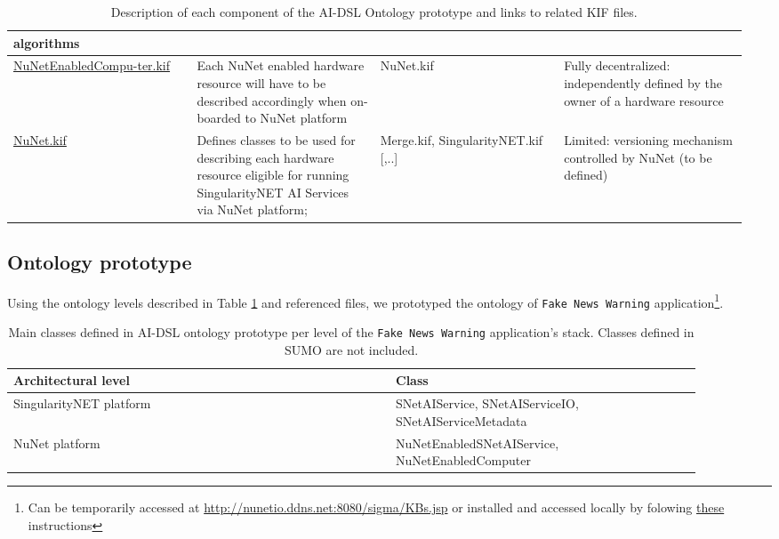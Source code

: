 \documentclass[]{report}
\begin{document}
\begin{table}[H]
\begin{tabular}{p{0.24\linewidth}|p{0.24\linewidth}|p{0.24\linewidth}|p{0.24\linewidth}|}
    algorithms \\
    \hline
    \href{https://github.com/singnet/ai-dsl/blob/master/ontology/
    NuNetEnabledComputer.kif}{NuNetEnabledCompu-ter.kif} &
    Each NuNet enabled hardware resource will have to be described accordingly
    when on-boarded to NuNet platform &
    NuNet.kif &
    Fully decentralized: independently defined by the owner of a hardware
    resource \\
    \hline
    \href{https://github.com/singnet/ai-dsl/blob/master/ontology/NuNet.kif}{NuNet.kif} &
    Defines classes to be used for describing each hardware resource eligible
    for running SingularityNET AI Services via NuNet platform;  &
    Merge.kif, SingularityNET.kif [,..]&
    Limited: versioning mechanism controlled by NuNet (to be defined) \\
    \end{tabular}
  \captionsetup{width=0.7\linewidth}
  \caption{\label{tbl:all_kif_files}Description of each component of the AI-DSL Ontology prototype and links to related KIF files.}
\end{table}

\subsection{Ontology prototype}

Using the ontology levels described in Table \ref{tbl:all_kif_files} and
referenced files, we prototyped the ontology of \texttt{Fake News Warning}
application\footnote{Can be temporarily
accessed at \href{http://nunetio.ddns.net:8080/sigma/KBs.jsp}
{http://nunetio.ddns.net:8080/sigma/KBs.jsp} or installed and accessed locally
by folowing \href{https://github.com/nunet-io/ai-dsl/blob/master/ontology/tools/README.md}{these} instructions}.

\begin{table}[H]
  \scriptsize
  \centering
  \begin{tabular}{p{0.5\linewidth}|p{0.4\linewidth}|}
    \textbf{Architectural level} & \textbf{Class} \\
    \hline
    SingularityNET platform & SNetAIService, SNetAIServiceIO,
    SNetAIServiceMetadata\\
    \hline
    NuNet platform & NuNetEnabledSNetAIService, NuNetEnabledComputer\\
  \end{tabular}
  \captionsetup{width=0.9\linewidth}
  \caption{\label{tbl:custom_classes_prototype}Main classes defined in AI-DSL
  ontology prototype per level of the \texttt{Fake News Warning} application's
  stack. Classes defined in SUMO are not included.}
\end{table}
\end{document}
